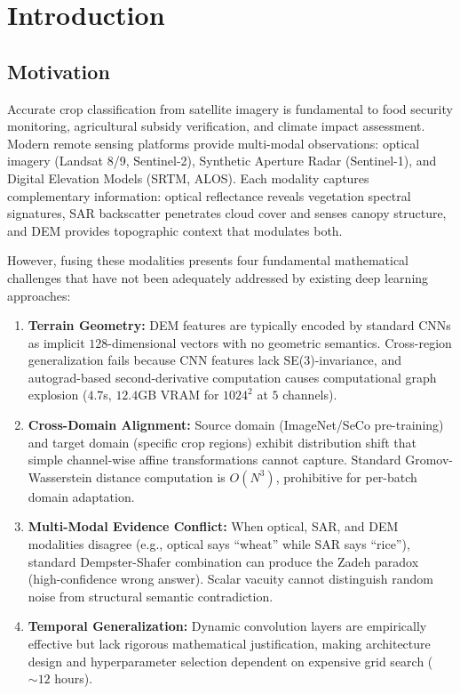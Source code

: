\section{Introduction}

\subsection{Motivation}

Accurate crop classification from satellite imagery is fundamental to food security
monitoring, agricultural subsidy verification, and climate impact assessment.
Modern remote sensing platforms provide multi-modal observations: optical imagery
(Landsat 8/9, Sentinel-2), Synthetic Aperture Radar (Sentinel-1), and Digital
Elevation Models (SRTM, ALOS). Each modality captures complementary information:
optical reflectance reveals vegetation spectral signatures, SAR backscatter
penetrates cloud cover and senses canopy structure, and DEM provides topographic
context that modulates both.

However, fusing these modalities presents four fundamental mathematical
challenges that have not been adequately addressed by existing deep learning
approaches:

\begin{enumerate}
    \item \textbf{Terrain Geometry:} DEM features are typically encoded by standard
    CNNs as implicit $128$-dimensional vectors with no geometric semantics.
    Cross-region generalization fails because CNN features lack SE(3)-invariance,
    and autograd-based second-derivative computation causes computational graph
    explosion ($4.7$s, $12.4$GB VRAM for $1024^2$ at $5$ channels).

    \item \textbf{Cross-Domain Alignment:} Source domain (ImageNet/SeCo pre-training)
    and target domain (specific crop regions) exhibit distribution shift that
    simple channel-wise affine transformations cannot capture. Standard
    Gromov-Wasserstein distance computation is $O(N^3)$, prohibitive for
    per-batch domain adaptation.

    \item \textbf{Multi-Modal Evidence Conflict:} When optical, SAR, and DEM
    modalities disagree (e.g., optical says ``wheat'' while SAR says ``rice''),
    standard Dempster-Shafer combination can produce the Zadeh paradox
    (high-confidence wrong answer). Scalar vacuity cannot distinguish random
    noise from structural semantic contradiction.

    \item \textbf{Temporal Generalization:} Dynamic convolution layers are
    empirically effective but lack rigorous mathematical justification,
    making architecture design and hyperparameter selection dependent on
    expensive grid search ($\sim12$ hours).
\end{enumerate}

